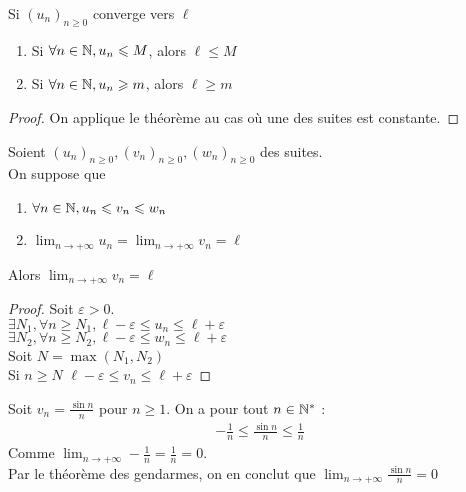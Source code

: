 \begin{graybox}
    \begin{corollaire}[]
    Si $(u_n)_{n \geq 0}$ converge vers $\ell$
    \begin{enumerate}
        \item Si $\forall n \in \mathbb{N}, u_n \leqslant M$, alors $\ell \leq M$
        \item Si $\forall n \in \mathbb{N}, u_n \geqslant m$, alors $\ell \geq m$
    \end{enumerate}
\end{corollaire}
\end{graybox}

\begin{proof}
    On applique le théorème au cas où une des suites est constante.
\end{proof}

\begin{theoreme}
    Soient $(u_n)_{n \geq 0}, (v_n)_{n \geq 0}, (w_n)_{n \geq 0}$ des suites. \\
    On suppose que 
    \begin{enumerate}
        \item $\forall n \in \mathbb{N}, u_n \leqslant v_n \leqslant w_n$
        \item $\displaystyle{\lim_{n \to +\infty} u_n = \lim_{n \to + \infty} v_n = \ell}$
    \end{enumerate}
    Alors $\displaystyle{\lim_{n \to +\infty} v_n = \ell}$
\end{theoreme}

\begin{proof}
    Soit $\varepsilon > 0$. \\
    $\exists N_1, \forall n \geq N_1, \ell - \varepsilon \leq u_n \leq \ell + \varepsilon$\\
    $\exists N_2, \forall n \geq N_2, \ell - \varepsilon \leq w_n \leq \ell + \varepsilon$ \\
    Soit $N = \max{(N_1, N_2)}$ \\
    Si $n \geq N$ $\ell - \varepsilon \leq v_n \leq \ell + \varepsilon$
\end{proof}

\begin{exemple}
    Soit $v_n = \frac{\sin{n}}{n}$ pour $n \geq 1$.
    On a pour tout $n \in \mathbb{N}^*$ :
    \begin{align*}
        -\frac{1}{n} \leq \frac{\sin{n}}{n} \leq \frac{1}{n}
    \end{align*}
    Comme $\displaystyle{\lim_{n \to +\infty} -\frac{1}{n} = \frac{1}{n} = 0}$.
    \\
    Par le théorème des gendarmes, on en conclut que $\displaystyle{\lim_{n \to +\infty} \frac{\sin{n}}{n} = 0}$
\end{exemple}


